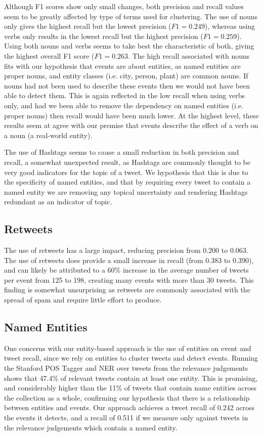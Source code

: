 Although F1 scores show only small changes, both precision and recall values seem to be greatly affected by type of terms used for clustering.
The use of nouns only gives the highest recall but the lowest precision (\(F1 = 0.249\)), whereas using verbs only results in the lowest recall but the highest precision (\(F1 = 0.259\)).
Using both nouns and verbs seems to take best the characteristic of both, giving the highest overall F1 score (\(F1 = 0.263\).
The high recall associated with nouns fits with our hypothesis that events are about entities, as named entities are proper nouns, and entity classes (i.e. city, person, plant) are common nouns.
If nouns had not been used to describe these events then we would not have been able to detect them.
This is again reflected in the low recall when using verbs only, and had we been able to remove the dependency on named entities (i.e. proper nouns) then recall would have been much lower.
At the highest level, these results seem at agree with our premise that events describe the effect of a verb on a noun (a real-world entity).

The use of Hashtags seems to cause a small reduction in both precision and recall, a somewhat unexpected result, as Hashtags are commonly thought to be very good indicators for the topic of a tweet.
We hypothesis that this is due to the specificity of named entities, and that by requiring every tweet to contain a named entity we are removing any topical uncertainty and rendering Hashtags redundant as an indicator of topic.

\subsection{Retweets}
\label{detection:sec:retweetsEval}
The use of retweets has a large impact, reducing precision from 0.200 to 0.063. The use of retweets does provide a small increase in recall (from 0.383 to 0.390), and can likely be attributed to a 60\% increase in the average number of tweets per event from 125 to 198, creating many events with more than 30 tweets. This finding is somewhat unsurprising as retweets are commonly  associated with the spread of spam and require little effort to produce.

\subsection{Named Entities}
\label{detection:sec:entitiesEval}
One concerns with our entity-based approach is the use of entities on event and tweet recall, since we rely on entities to cluster tweets and detect events.
Running the Stanford POS Tagger and NER over tweets from the relevance judgements shows that 47.4\% of relevant tweets contain at least one entity. This is promising, and considerably higher than the 11\% of tweets that contain name entities across the collection as a whole, confirming our hypothesis that there is a relationship between entities and events.
Our approach achieves a tweet recall of 0.242 across the events it detects, and a recall of 0.511 if we measure only against tweets in the relevance judgements which contain a named entity.

